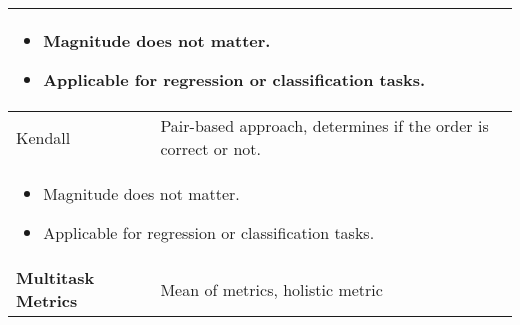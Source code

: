 \begin{summary}
\begin{center}
\begin{tabular}{ll}
        \multicolumn{2}{p{\linewidth}}{
        \begin{itemize}
            \item Magnitude does not matter.
            \item Applicable for regression or classification tasks.
        \end{itemize}} \\
        \midrule
        Kendall & Pair-based approach, determines if the order is correct or not. \\
        \multicolumn{2}{p{\linewidth}}{
        \begin{itemize}
            \item Magnitude does not matter.
            \item Applicable for regression or classification tasks.
        \end{itemize}} \\
        \midrule
        \textbf{Multitask Metrics} & Mean of metrics, holistic metric \\
        \bottomrule
        \end{tabular}
    \end{center}
\end{summary}
\newpage

